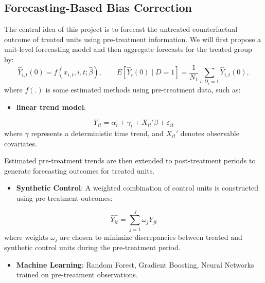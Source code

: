 \documentclass[12pt]{article}
\begin{document}
\subsection{Forecasting-Based Bias Correction}

The central idea of this project is to forecast the untreated counterfactual outcome of treated units using pre-treatment information. We will first propose a unit-level forecasting model and then aggregate forecasts for the treated group by:
\begin{equation}
    \label{eq:placeholder_label}
    \widehat{Y}_{i,t}(0) = f(x_{i,t}, i, t; \hat{\beta}), \qquad 
    E[\widehat{Y}_{t}(0) \mid D = 1] = \frac{1}{N_1} \sum_{i : D_i = 1} \widehat{Y}_{i,t}(0),
\end{equation}
where \(f (.)\) is some estimated methods using pre-treatment data, such as:
\begin{itemize}
    \item \textbf{linear trend model}:  %
\end{itemize}
\begin{equation}
    Y_{it} = \alpha_i + \gamma_t + X_{it}' \beta + \varepsilon_{it}
    \label{eq:placeholder_label}
\end{equation}
where \(\gamma\) represents a deterministic time trend, and \(X_{it}'\) denotes observable covariates. 

Estimated pre-treatment trends are then extended to post-treatment periods to generate forecasting outcomes for treated units. 

\begin{itemize}
    \item \textbf{Synthetic Control}: A weighted combination of control units is constructed using pre-treatment outcomes: %
\end{itemize}
\begin{equation}
   \hat{Y_{it}}  = \sum^{J}_{j=1}\omega_{j}Y_{jt}
    \label{eq:placeholder_label}
\end{equation}
where weights \(\omega_{j}\) are chosen to minimize discrepancies between treated and synthetic control units during the pre-treatment period.

\begin{itemize}
    \item \textbf{Machine Learning}: Random Forest, Gradient Boosting, Neural Networks trained on pre-treatment observations.
\end{itemize}
\end{document}
